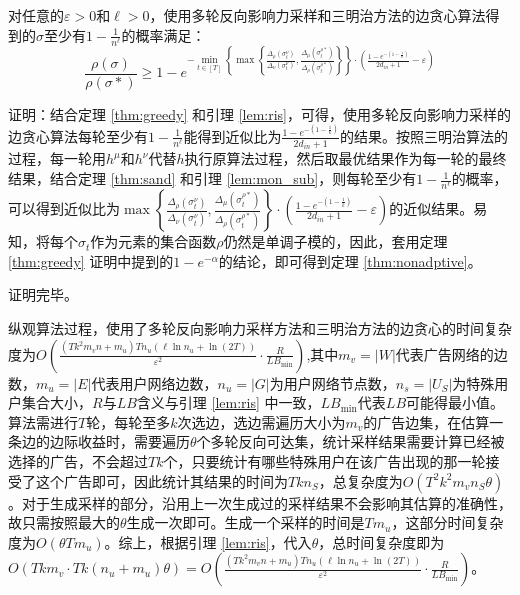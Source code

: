 \begin{theorem}
\label{thm:nonadptive}
对任意的$\varepsilon>0$和$\ell > 0$，使用多轮反向影响力采样和三明治方法的边贪心算法得到的$\sigma$至少有$1-\frac{1}{n^{\ell}}$的概率满足：
\begin{equation}
\frac{\rho(\sigma)}{\rho(\sigma*)} \ge 1-e^{-\min_{t \in [T]}\left\{\max\left\{\frac{\Delta_\rho(\sigma_t^\nu)}{\Delta_\nu(\sigma_t^\nu)},\frac{\Delta_\mu(\sigma_t^{\rho*})}{\Delta_\rho(\sigma_t^{\rho*})} \right\}\right\}\cdot\left(\frac{1-e^{-(1-\frac{1}{k})}}{2d_{in}+1}-\varepsilon\right)}
\end{equation}
\end{theorem}

\noindent 证明：结合定理 \ref{thm:greedy} 和引理 \ref{lem:ris}，可得，使用多轮反向影响力采样的边贪心算法每轮至少有$1-\frac{1}{n^{\ell}}$能得到近似比为$\frac{1-e^{-(1-\frac{1}{k})}}{2d_{in}+1}$的结果。按照三明治算法的过程，每一轮用$h^\mu$和$h^\nu$代替$h$执行原算法过程，然后取最优结果作为每一轮的最终结果，结合定理 \ref{thm:sand} 和引理 \ref{lem:mon_sub}，则每轮至少有$1-\frac{1}{n^{\ell}}$的概率，可以得到近似比为$\max\left\{\frac{\Delta_\rho(\sigma_t^\nu)}{\Delta_\nu(\sigma_t^\nu)},\frac{\Delta_\mu(\sigma_t^{\rho*})}{\Delta_\rho(\sigma_t^{\rho*})} \right\}\cdot\left(\frac{1-e^{-(1-\frac{1}{k})}}{2d_{in}+1}-\varepsilon\right)$的近似结果。易知，将每个$\sigma_t$作为元素的集合函数$\rho$仍然是单调子模的，因此，套用定理 \ref{thm:greedy} 证明中提到的$1-e^{-\alpha}$的结论，即可得到定理 \ref{thm:nonadptive}。

\noindent 证明完毕。

纵观算法过程，使用了多轮反向影响力采样方法和三明治方法的边贪心的时间复杂度为$O\left(\frac{(Tk^2 m_v n + m_u)Tn_u(\ell \ln n_u + \ln (2T))}{\varepsilon^2}\cdot\frac{R}{LB_{\min}}\right)$,其中$m_v=|W|$代表广告网络的边数，$m_u=|E|$代表用户网络边数，$n_u=|G|$为用户网络节点数，$n_s=|U_S|$为特殊用户集合大小，$R$与$LB$含义与引理 \ref{lem:ris} 中一致，$LB_{\min}$代表$LB$可能得最小值。算法需进行$T$轮，每轮至多$k$次选边，选边需遍历大小为$m_v$的广告边集，在估算一条边的边际收益时，需要遍历$\theta$个多轮反向可达集，统计采样结果需要计算已经被选择的广告，不会超过$Tk$个，只要统计有哪些特殊用户在该广告出现的那一轮接受了这个广告即可，因此统计其结果的时间为$Tkn_S$，总复杂度为$O(T^2k^2m_vn_S\theta)$。对于生成采样的部分，沿用上一次生成过的采样结果不会影响其估算的准确性，故只需按照最大的$\theta$生成一次即可。生成一个采样的时间是$Tm_u$，这部分时间复杂度为$O(\theta Tm_u)$。综上，根据引理 \ref{lem:ris}，代入$\theta$，总时间复杂度即为$O(Tkm_v\cdot Tk(n_u+m_u)\theta) = O\left(\frac{(Tk^2 m_v n + m_u)Tn_u(\ell \ln n_u + \ln (2T))}{\varepsilon^2}\cdot\frac{R}{LB_{\min}}\right)$。


